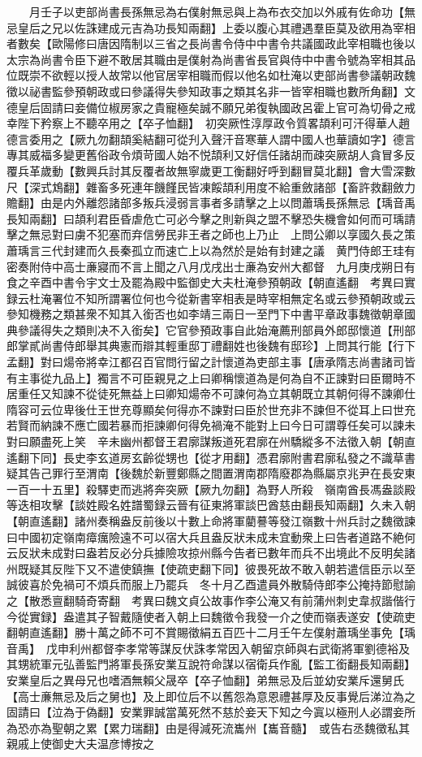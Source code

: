 　　月壬子以吏部尚書長孫無忌為右僕射無忌與上為布衣交加以外戚有佐命功【無忌皇后之兄以佐誅建成元吉為功長知兩翻】上委以腹心其禮遇羣臣莫及欲用為宰相者數矣【歐陽修曰唐因隋制以三省之長尚書令侍中中書令共議國政此宰相職也後以太宗為尚書令臣下避不敢居其職由是僕射為尚書省長官與侍中中書令號為宰相其品位既崇不欲輕以授人故常以他官居宰相職而假以他名如杜淹以吏部尚書參議朝政魏徵以祕書監參預朝政或曰參議得失參知政事之類其名非一皆宰相職也數所角翻】文德皇后固請曰妾備位椒房家之貴寵極矣誠不願兄弟復執國政呂霍上官可為切骨之戒幸陛下矜察上不聽卒用之【卒子恤翻】　初突厥性淳厚政令質畧頡利可汗得華人趙德言委用之【厥九勿翻頡奚結翻可從刋入聲汗音寒華人謂中國人也華讀如字】德言專其威福多變更舊俗政令煩苛國人始不悦頡利又好信任諸胡而疎突厥胡人貪冒多反覆兵革歲動【數興兵討其反覆者故無寧歲更工衡翻好呼到翻冒莫北翻】會大雪深數尺【深式鴆翻】雜畜多死連年饑饉民皆凍餒頡利用度不給重斂諸部【畜許救翻斂力贍翻】由是内外離怨諸部多叛兵浸弱言事者多請擊之上以問蕭瑀長孫無忌【瑀音禹長知兩翻】曰頡利君臣昏虐危亡可必今擊之則新與之盟不擊恐失機會如何而可瑀請擊之無忌對曰虜不犯塞而弃信勞民非王者之師也上乃止　上問公卿以享國久長之策蕭瑀言三代封建而久長秦孤立而速亡上以為然於是始有封建之議　黄門侍郎王珪有密奏附侍中高士亷寢而不言上聞之八月戊戌出士亷為安州大都督　九月庚戌朔日有食之辛酉中書令宇文士及罷為殿中監御史大夫杜淹參預朝政【朝直遙翻　考異曰實録云杜淹署位不知所謂署位何也今從新書宰相表是時宰相無定名或云參預朝政或云參知機務之類甚衆不知其入銜否也如李靖三兩日一至門下中書平章政事魏徵朝章國典參議得失之類則决不入銜矣】它官參預政事自此始淹薦刑部員外郎邸懷道【刑部郎掌貳尚書侍郎舉其典憲而辯其輕重邸丁禮翻姓也後魏有邸珍】上問其行能【行下孟翻】對曰煬帝將幸江都召百官問行留之計懷道為吏部主事【唐承隋志尚書諸司皆有主事從九品上】獨言不可臣親見之上曰卿稱懷道為是何為自不正諫對曰臣爾時不居重任又知諫不從徒死無益上曰卿知煬帝不可諫何為立其朝既立其朝何得不諫卿仕隋容可云位卑後仕王世充尊顯矣何得亦不諫對曰臣於世充非不諫但不從耳上曰世充若賢而納諫不應亡國若暴而拒諫卿何得免禍淹不能對上曰今日可謂尊任矣可以諫未對曰願盡死上笑　辛未幽州都督王君廓謀叛道死君廓在州驕縱多不法徵入朝【朝直遙翻下同】長史李玄道房玄齡從甥也【從才用翻】憑君廓附書君廓私發之不識草書疑其告己罪行至渭南【後魏於新豐鄭縣之間置渭南郡隋廢郡為縣屬京兆尹在長安東一百一十五里】殺驛吏而逃將奔突厥【厥九勿翻】為野人所殺　嶺南酋長馮盎談殿等迭相攻擊【談姓殿名姓譜蜀録云晉有征東將軍談巴酋慈由翻長知兩翻】久未入朝【朝直遙翻】諸州奏稱盎反前後以十數上命將軍藺謩等發江嶺數十州兵討之魏徵諫曰中國初定嶺南瘴癘險遠不可以宿大兵且盎反狀未成未宜動衆上曰告者道路不絶何云反狀未成對曰盎若反必分兵據險攻掠州縣今告者已數年而兵不出境此不反明矣諸州既疑其反陛下又不遣使鎮撫【使疏吏翻下同】彼畏死故不敢入朝若遣信臣示以至誠彼喜於免禍可不煩兵而服上乃罷兵　冬十月乙酉遣員外散騎侍郎李公掩持節慰諭之【散悉亶翻騎奇寄翻　考異曰魏文貞公故事作李公淹又有前蒲州刺史韋叔諧偕行今從實録】盎遣其子智戴隨使者入朝上曰魏徵令我發一介之使而嶺表遂安【使疏吏翻朝直遙翻】勝十萬之師不可不賞賜徵絹五百匹十二月壬午左僕射蕭瑀坐事免【瑀音禹】　戊申利州都督李孝常等謀反伏誅孝常因入朝留京師與右武衛將軍劉德裕及其甥統軍元弘善監門將軍長孫安業互說符命謀以宿衛兵作亂【監工銜翻長知兩翻】安業皇后之異母兄也嗜酒無賴父晟卒【卒子恤翻】弟無忌及后並幼安業斥還舅氏【高士亷無忌及后之舅也】及上即位后不以舊怨為意恩禮甚厚及反事覺后涕泣為之固請曰【泣為于偽翻】安業罪誠當萬死然不慈於妾天下知之今寘以極刑人必謂妾所為恐亦為聖朝之累【累力瑞翻】由是得減死流巂州【巂音髓】　或告右丞魏徵私其親戚上使御史大夫温彦博按之